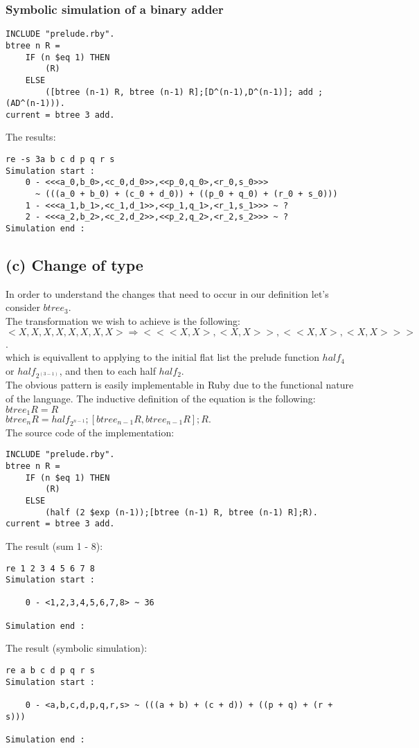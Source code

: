 \documentclass[a4paper,10pt]{article}
\begin{document}
\subsubsection*{Symbolic simulation of a binary adder}
\begin{Verbatim}
INCLUDE "prelude.rby".
btree n R = 
	IF (n $eq 1) THEN
		(R) 
	ELSE 
		([btree (n-1) R, btree (n-1) R];[D^(n-1),D^(n-1)]; add ; (AD^(n-1))).
current = btree 3 add.
\end{Verbatim}
The results:
\begin{Verbatim}
re -s 3a b c d p q r s
Simulation start :
    0 - <<<a_0,b_0>,<c_0,d_0>>,<<p_0,q_0>,<r_0,s_0>>> 
	  ~ (((a_0 + b_0) + (c_0 + d_0)) + ((p_0 + q_0) + (r_0 + s_0)))
    1 - <<<a_1,b_1>,<c_1,d_1>>,<<p_1,q_1>,<r_1,s_1>>> ~ ?
    2 - <<<a_2,b_2>,<c_2,d_2>>,<<p_2,q_2>,<r_2,s_2>>> ~ ?
Simulation end :
\end{Verbatim}

\subsection*{(c) Change of type}
In order to understand the changes that need to occur in our definition let's consider $btree_3$. \\[0.5cm]
The transformation we wish to achieve is the following: \\[0.25cm]
$<X,X,X,X,X,X,X,X> \Rightarrow <<<X,X>,<X,X>>,<<X,X>,<X,X>>>$. \\[0.25cm]
which is equivallent to applying to the initial flat list the prelude function $half_4$ or $half_{2^(3-1)}$, and then to each half $half_2$. \\[0.25cm]
The obvious pattern is easily implementable in Ruby due to the functional nature of the language. The inductive definition of the equation is the following:
\\[0.5cm]
$btree_1 R = R$ \\[0.25cm]
$btree_n R = half_{2^{n-1}};[btree_{n-1} R, btree_{n-1} R];R.$ \\[0.25cm]
The source code of the implementation:
\begin{Verbatim}
INCLUDE "prelude.rby".
btree n R =
	IF (n $eq 1) THEN
		(R)
	ELSE
		(half (2 $exp (n-1));[btree (n-1) R, btree (n-1) R];R).
current = btree 3 add.
\end{Verbatim}
The result (sum 1 - 8):
\begin{Verbatim}
re 1 2 3 4 5 6 7 8
Simulation start :

    0 - <1,2,3,4,5,6,7,8> ~ 36

Simulation end :
\end{Verbatim}
The result (symbolic simulation):
\begin{Verbatim}
re a b c d p q r s
Simulation start :

    0 - <a,b,c,d,p,q,r,s> ~ (((a + b) + (c + d)) + ((p + q) + (r + s)))

Simulation end :
\end{Verbatim}
\end{document}

